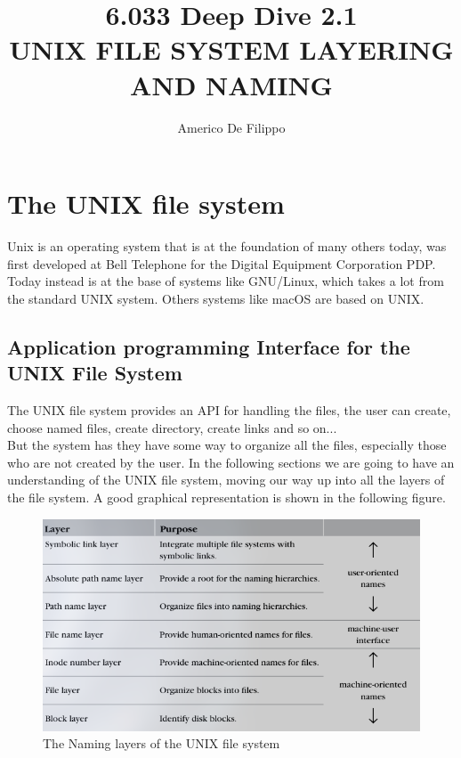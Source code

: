 \documentclass{article}
\title{6.033 Deep Dive 2.1 \\ UNIX FILE SYSTEM LAYERING AND NAMING}
\author{Americo De Filippo}
\begin{document}
  \maketitle
  \section{The UNIX file system}
    Unix is an operating system that is at the foundation
    of many others today, was first developed at Bell Telephone
    for the Digital Equipment Corporation PDP. Today instead
    is at the base of systems like GNU/Linux, which takes a lot
    from the standard UNIX system. Others systems like macOS are based
    on UNIX.
    \subsection{Application programming Interface for the UNIX File System}
      The UNIX file system provides an API for handling the files, the 
      user can create, choose named files, create directory, create links
      and so on... \\ But the system has they have some way to 
      organize all the files, especially those who are not created by the
      user. In the following sections we are going to have an understanding
      of the UNIX file system, moving our way up into all the layers of the
      file system. A good graphical representation is shown in the following 
      figure.
      \begin{figure}[h]
        \centering
        \includegraphics[width=.6\textwidth]{images/unix-layers.png}
        \caption{The Naming layers of the UNIX file system}
        \label{fig:mesh1}
      \end{figure}
\end{document}

